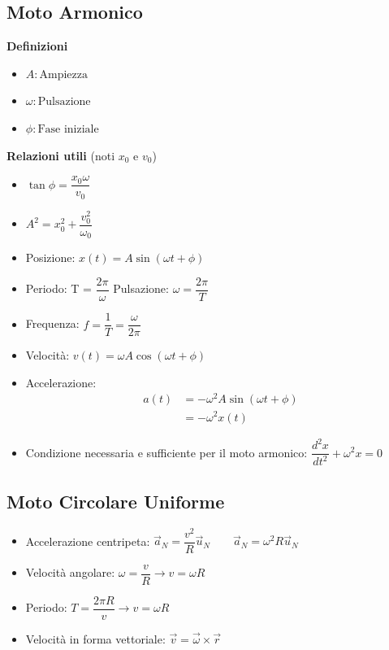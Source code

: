 \documentclass[10pt,a4paper]{article}
\begin{document}
	\subsection{Moto Armonico}
	\begin{tcolorbox}
	\large \textbf{Definizioni}
	\begin{itemize}
	\item \( A : \text{Ampiezza} \) 
	\item \( \omega : \text{Pulsazione} \) 
	\item \( \phi : \text{Fase iniziale} \) 
	\end{itemize}
	\vspace{3mm}
	\large \textbf{Relazioni utili} (noti \(x_0\) e \(v_0\))
	\begin{itemize}
	\item \( \tan\phi = \dfrac{x_0\omega}{v_0} \)
	\item \( A^2 = x_0^2+\dfrac{v_0^2}{\omega_0} \)
	\end{itemize}
	\end{tcolorbox}
	\begin{itemize}
	\item Posizione: \( x(t) = A\sin(\omega t + \phi) \)
	\item Periodo: T = \( \dfrac{2\pi}{\omega} \) \hspace{5mm} Pulsazione: \( \omega = \dfrac{2\pi}{T} \) 
	\item Frequenza: \( f = \dfrac{1}{T} = \dfrac{\omega}{2\pi} \)
	\item Velocità: \( v(t) = \omega A\cos(\omega t+\phi) \)
	\item Accelerazione: 
		\begin{align*}
		a(t) & = -\omega^2 A\sin(\omega t+\phi) \\
		& = -\omega^2x(t) 
		\end{align*}
	\item Condizione necessaria e sufficiente per il moto armonico: \( \dfrac{d^2x}{dt^2}+\omega^2x = 0 \)
	\end{itemize}

	\vspace{5mm}
	\subsection{Moto Circolare Uniforme}
	\begin{itemize}
	\item Accelerazione centripeta: \( \vec{a}_N = \dfrac{v^2}{R}\vec{u}_N \qquad \vec{a}_N = \omega^2R\vec{u}_N \)  
	\item Velocità angolare: \( \omega = \dfrac{v}{R} \rightarrow v = \omega R \)
	\item Periodo: \( T = \dfrac{2\pi R}{v} \rightarrow v = \omega R \)
	\item Velocità in forma vettoriale: \( \vec{v} = \vec{\omega} \times \vec{r} \)
	\end{itemize}
\end{document}
